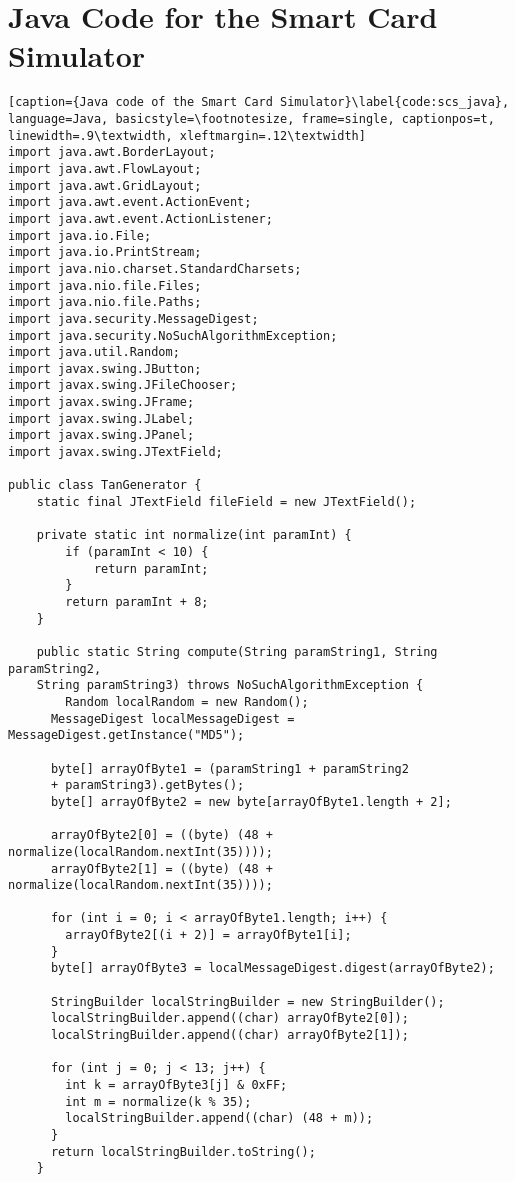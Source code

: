 \section{Java Code for the Smart Card Simulator}

\begin{lstlisting}[caption={Java code of the Smart Card Simulator}\label{code:scs_java}, language=Java, basicstyle=\footnotesize, frame=single, captionpos=t, linewidth=.9\textwidth, xleftmargin=.12\textwidth]
import java.awt.BorderLayout;
import java.awt.FlowLayout;
import java.awt.GridLayout;
import java.awt.event.ActionEvent;
import java.awt.event.ActionListener;
import java.io.File;
import java.io.PrintStream;
import java.nio.charset.StandardCharsets;
import java.nio.file.Files;
import java.nio.file.Paths;
import java.security.MessageDigest;
import java.security.NoSuchAlgorithmException;
import java.util.Random;
import javax.swing.JButton;
import javax.swing.JFileChooser;
import javax.swing.JFrame;
import javax.swing.JLabel;
import javax.swing.JPanel;
import javax.swing.JTextField;

public class TanGenerator {
	static final JTextField fileField = new JTextField();

	private static int normalize(int paramInt) {
		if (paramInt < 10) {
			return paramInt;
		}
		return paramInt + 8;
	}

	public static String compute(String paramString1, String paramString2,
	String paramString3) throws NoSuchAlgorithmException {
		Random localRandom = new Random();
      MessageDigest localMessageDigest = MessageDigest.getInstance("MD5");

	  byte[] arrayOfByte1 = (paramString1 + paramString2
	  + paramString3).getBytes();
	  byte[] arrayOfByte2 = new byte[arrayOfByte1.length + 2];

	  arrayOfByte2[0] = ((byte) (48 + normalize(localRandom.nextInt(35))));
	  arrayOfByte2[1] = ((byte) (48 + normalize(localRandom.nextInt(35))));

	  for (int i = 0; i < arrayOfByte1.length; i++) {
		arrayOfByte2[(i + 2)] = arrayOfByte1[i];
	  }
	  byte[] arrayOfByte3 = localMessageDigest.digest(arrayOfByte2);

	  StringBuilder localStringBuilder = new StringBuilder();
	  localStringBuilder.append((char) arrayOfByte2[0]);
	  localStringBuilder.append((char) arrayOfByte2[1]);

	  for (int j = 0; j < 13; j++) {
		int k = arrayOfByte3[j] & 0xFF;
		int m = normalize(k % 35);
		localStringBuilder.append((char) (48 + m));
	  }
	  return localStringBuilder.toString();
	}


\end{lstlisting}
